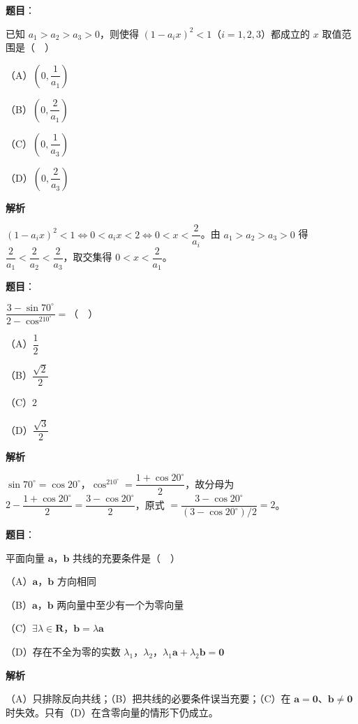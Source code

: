 \begin{answer}

\textbf{题目}：

已知 $a_1>a_2>a_3>0$，则使得 $(1-a_ix)^2<1$（$i=1,2,3$）都成立的 $x$ 取值范围是（　）

（A）$\left(0,\dfrac1{a_1}\right)$

（B）$\left(0,\dfrac2{a_1}\right)$

（C）$\left(0,\dfrac1{a_3}\right)$

（D）$\left(0,\dfrac2{a_3}\right)$

\textbf{解析}

$(1-a_ix)^2<1\iff0<a_ix<2\iff0<x<\dfrac2{a_i}$。由 $a_1>a_2>a_3>0$ 得 $\dfrac2{a_1}<\dfrac2{a_2}<\dfrac2{a_3}$，取交集得 $0<x<\dfrac2{a_1}$。


\end{answer}
\begin{answer}

\textbf{题目}：

$\dfrac{3-\sin70^\circ}{2-\cos^210^\circ}=$（　）

（A）$\dfrac12$

（B）$\dfrac{\sqrt2}2$

（C）$2$

（D）$\dfrac{\sqrt3}2$

\textbf{解析}

$\sin70^\circ=\cos20^\circ$，$\cos^210^\circ=\dfrac{1+\cos20^\circ}2$，故分母为 $2-\dfrac{1+\cos20^\circ}2=\dfrac{3-\cos20^\circ}2$，原式 $=\dfrac{3-\cos20^\circ}{(3-\cos20^\circ)/2}=2$。


\end{answer}
\begin{answer}

\textbf{题目}：

平面向量 $\boldsymbol a$，$\boldsymbol b$ 共线的充要条件是（　）

（A）$\boldsymbol a$，$\boldsymbol b$ 方向相同

（B）$\boldsymbol a$，$\boldsymbol b$ 两向量中至少有一个为零向量

（C）$\exists\lambda\in\mathbf R$，$\boldsymbol b=\lambda\boldsymbol a$

（D）存在不全为零的实数 $\lambda_1$，$\lambda_2$，$\lambda_1\boldsymbol a+\lambda_2\boldsymbol b=\boldsymbol 0$

\textbf{解析}

（A）只排除反向共线；（B）把共线的必要条件误当充要；（C）在 $\boldsymbol a=\boldsymbol 0$、$\boldsymbol b\neq\boldsymbol 0$ 时失效。只有（D）在含零向量的情形下仍成立。


\end{answer}
